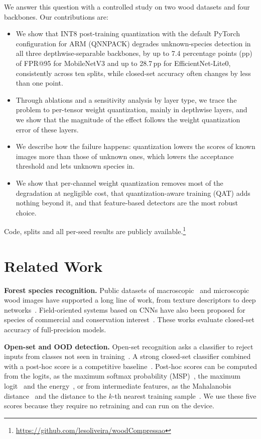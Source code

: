 \documentclass[conference]{IEEEtran}
\begin{document}
We answer this question with a controlled study on two wood datasets and four backbones. Our contributions are:
\begin{itemize}
\item We show that INT8 post-training quantization with the default PyTorch configuration for ARM (QNNPACK) degrades unknown-species detection in all three depthwise-separable backbones, by up to 7.4 percentage points (pp) of FPR@95 for MobileNetV3 and up to 28.7\,pp for EfficientNet-Lite0, consistently across ten splits, while closed-set accuracy often changes by less than one point.
\item Through ablations and a sensitivity analysis by layer type, we trace the problem to per-tensor weight quantization, mainly in depthwise layers, and we show that the magnitude of the effect follows the weight quantization error of these layers.
\item We describe how the failure happens: quantization lowers the scores of known images more than those of unknown ones, which lowers the acceptance threshold and lets unknown species in.
\item We show that per-channel weight quantization removes most of the degradation at negligible cost, that quantization-aware training (QAT) adds nothing beyond it, and that feature-based detectors are the most robust choice.
\end{itemize}
Code, splits and all per-seed results are publicly available.\footnote{\url{https://github.com/lesoliveira/woodCompressao}}

\section{Related Work}

\textbf{Forest species recognition.} Public datasets of macroscopic~\cite{paula2014forest} and microscopic~\cite{martins2013database} wood images have supported a long line of work, from texture descriptors to deep networks~\cite{hafemann2014forest}. Field-oriented systems based on CNNs have also been proposed for species of commercial and conservation interest~\cite{ravindran2018meliaceae}. These works evaluate closed-set accuracy of full-precision models.

\textbf{Open-set and OOD detection.} Open-set recognition asks a classifier to reject inputs from classes not seen in training~\cite{scheirer2013open,bendale2015open}. A strong closed-set classifier combined with a post-hoc score is a competitive baseline~\cite{vaze2022open}. Post-hoc scores can be computed from the logits, as the maximum softmax probability (MSP)~\cite{hendrycks2017baseline}, the maximum logit~\cite{hendrycks2022scaling} and the energy~\cite{liu2020energy}, or from intermediate features, as the Mahalanobis distance~\cite{lee2018simple} and the distance to the $k$-th nearest training sample~\cite{sun2022knn}. We use these five scores because they require no retraining and can run on the device.
\end{document}
